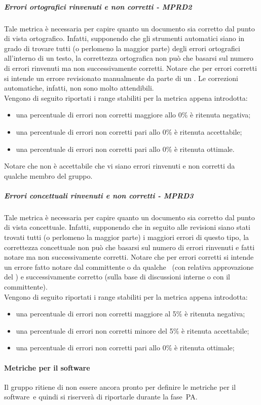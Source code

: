 \documentclass[../PianoDiQualifica.tex]{subfiles}
\begin{document}
				\subparagraph{Errori ortografici rinvenuti e non corretti - MPRD2}
				Tale metrica è necessaria per capire quanto un documento sia corretto dal punto di vista ortografico. Infatti, supponendo che gli strumenti automatici siano in grado di trovare tutti (o perlomeno la maggior parte) degli errori ortografici all'interno di un testo, la correttezza ortografica non può che basarsi sul numero di errori rinvenuti ma non successivamente corretti. Notare che per errori corretti si intende un errore revisionato manualmente da parte di un \verificatore. Le correzioni automatiche, infatti, non sono molto attendibili. \\
				Vengono di seguito riportati i range stabiliti per la metrica appena introdotta:
				\begin{itemize}
					\item una percentuale di errori non corretti maggiore allo 0\% è ritenuta negativa;
					\item una percentuale di errori non corretti pari allo 0\% è ritenuta accettabile;
					\item una percentuale di errori non corretti pari allo 0\% è ritenuta ottimale.
				\end{itemize}
				Notare che non è accettabile che vi siano errori rinvenuti e non corretti da qualche membro del gruppo.
				\subparagraph{Errori concettuali rinvenuti e non corretti - MPRD3}
				Tale metrica è necessaria per capire quanto un documento sia corretto dal punto di vista concettuale. Infatti, supponendo che in seguito alle revisioni siano stati trovati tutti (o perlomeno la maggior parte) i maggiori errori di questo tipo, la correttezza concettuale non può che basarsi sul numero di errori rinvenuti e fatti notare ma non successivamente corretti. Notare che per errori corretti si intende un errore fatto notare dal committente o da qualche \verificatore\ (con relativa approvazione del \responsabilediprogetto) e successivamente corretto (sulla base di discussioni interne o con il committente).\\
				Vengono di seguito riportati i range stabiliti per la metrica appena introdotta:
				\begin{itemize}
					\item una percentuale di errori non corretti maggiore al 5\% è ritenuta negativa;
					\item una percentuale di errori non corretti minore del 5\% è ritenuta accettabile;
					\item una percentuale di errori non corretti pari allo 0\% è ritenuta ottimale;
				\end{itemize}	

			\paragraph{Metriche per il software}
			Il gruppo ritiene di non essere ancora pronto per definire le metriche per il software\g\ e quindi si riserverà di riportarle durante la fase\g\ PA.
\end{document}
